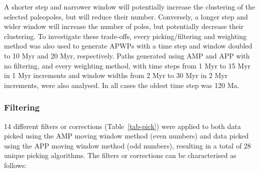 A shorter step and narrower window will potentially increase the clustering of
the selected paleopoles, but will reduce their number. Conversely, a longer step
and wider window will increase the number of poles, but potentially decrease
their clustering. To investigate these trade-offs, every picking/filtering and
weighting method was also used to generate APWPs with a time step and window
doubled to 10 Myr and 20 Myr, respectively. Paths generated using AMP and APP
with no filtering, and every weighting method, with time steps from 1 Myr to 15
Myr in 1 Myr increments and window widths from 2 Myr to 30 Myr in 2 Myr
increments, were also analysed. In all cases the oldest time step was 120 Ma.

\subsubsection{Filtering}\label{sec:f}

14 different filters or corrections (Table~\ref{tab-pick}) were applied to both
data picked using the AMP moving window method (even numbers) and data picked
using the APP moving window method (odd numbers), resulting in a total of 28
unique picking algorithms. The filters or corrections can be characterised as
follows:

